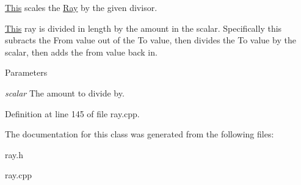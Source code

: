 \hyperlink{structThis}{This} scales the \hyperlink{classphys_1_1Ray}{Ray} by the given divisor. 

\hyperlink{structThis}{This} ray is divided in length by the amount in the scalar. Specifically this subracts the From value out of the To value, then divides the To value by the scalar, then adds the from value back in. 
\begin{DoxyParams}{Parameters}
\item[{\em scalar}]The amount to divide by. \end{DoxyParams}


Definition at line 145 of file ray.cpp.



The documentation for this class was generated from the following files:\begin{DoxyCompactItemize}
\item 
ray.h\item 
ray.cpp\end{DoxyCompactItemize}
